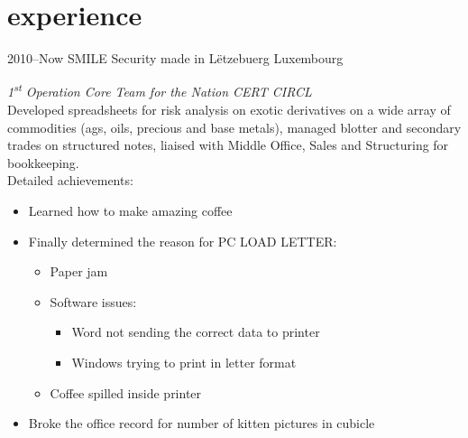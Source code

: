 \documentclass[]{friggeri-cv} %
\begin{document}

\section{experience}

\begin{entrylist}
\entry
{2010--Now}
{SMILE Security made in L\"{e}tzebuerg}
{Luxembourg}
{\emph{1\textsuperscript{st} Operation Core Team for the Nation CERT CIRCL} \\

Developed spreadsheets for risk analysis on exotic derivatives on a wide array of commodities (ags, oils, precious and base metals), managed blotter and secondary trades on structured notes, liaised with Middle Office, Sales and Structuring for bookkeeping. \\
Detailed achievements:

\begin{itemize}
\item Learned how to make amazing coffee
\item Finally determined the reason for \textsc{PC LOAD LETTER}:
\begin{itemize}
\item Paper jam
\item Software issues:
\begin{itemize}
\item Word not sending the correct data to printer
\item Windows trying to print in letter format
\end{itemize}
\item Coffee spilled inside printer
\end{itemize}
\item Broke the office record for number of kitten pictures in cubicle
\end{itemize}}


\end{entrylist}
\end{document}

